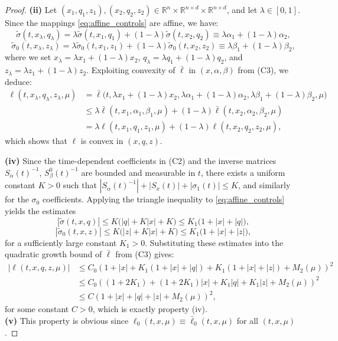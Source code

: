 \documentclass[11pt,a4paper]{article}
\begin{document}
\begin{proof}
\noindent
\textbf{(ii)} Let $(x_1, q_1, z_1),(x_2, q_2, z_2) \in \mathbb{R}^n \times \mathbb{R}^{n\times d} \times \mathbb{R}^{n\times d}$, and let $\lambda \in [0,1]$. Since the mappings \eqref{eq:affine_controls} are affine, we have:
\[
\tilde{\sigma}(t, x_\lambda, q_\lambda) = \lambda \tilde{\sigma}(t, x_1, q_1) + (1-\lambda)\tilde{\sigma}(t, x_2, q_2) \equiv \lambda \alpha_1 + (1-\lambda)\alpha_2,
\]
\[
\tilde{\sigma}_0(t, x_\lambda, z_\lambda) = \lambda \tilde{\sigma}_0(t, x_1, z_1) + (1-\lambda)\tilde{\sigma}_0(t, x_2, z_2) \equiv \lambda \beta_1 + (1-\lambda)\beta_2,
\]
where we set $x_\lambda = \lambda x_1 + (1-\lambda)x_2$, $q_\lambda = \lambda q_1 + (1-\lambda)q_2$, and $z_\lambda = \lambda z_1 + (1-\lambda)z_2$. Exploiting convexity of $\bar{\ell}$ in $(x,\alpha,\beta)$ from \textnormal{(C3)}, we deduce:
\begin{align*}
\ell(t, x_\lambda, q_\lambda, z_\lambda, \mu) &= \bar{\ell}\big(t, \lambda x_1 + (1-\lambda)x_2, \lambda \alpha_1 + (1-\lambda)\alpha_2, \lambda \beta_1 + (1-\lambda)\beta_2, \mu\big) \\
&\leq \lambda \bar{\ell}(t, x_1, \alpha_1, \beta_1, \mu) + (1-\lambda)\bar{\ell}(t, x_2, \alpha_2, \beta_2, \mu) \\
&= \lambda \ell(t, x_1, q_1, z_1, \mu) + (1-\lambda)\ell(t, x_2, q_2, z_2, \mu),
\end{align*}
which shows that $\ell$ is  convex in $(x,q,z)$.

\smallskip
\noindent
\textbf{(iv)}  Since the time-dependent coefficients in (C2) and the inverse matrices $S_\alpha (t)^{-1}$, $S_\beta^0(t)^{-1}$ are bounded and measurable in $t$, there exists a uniform constant $K > 0$ such that $|S_\alpha(t)^{-1}| + |S_x(t)| +|\sigma_1(t)| \leq K$, and similarly for the $\sigma_0$ coefficients. Applying the triangle inequality to \eqref{eq:affine_controls} yields the estimates
\[
|\tilde{\sigma}(t, x, q)| \leq K\big(|q| + K|x| + K\big) \leq K_1\big(1 + |x| + |q|\big),
\]
\[
|\tilde{\sigma}_0(t, x, z)| \leq K\big(|z| + K|x| + K\big) \leq K_1\big(1 + |x| + |z|\big),
\]
for a sufficiently large constant $K_1 > 0$. Substituting these estimates into the quadratic growth bound of $\bar{\ell}$ from \textnormal{(C3)} gives:
\begin{align*}

|\ell(t,x,q,z,\mu)| &\leq C_0 \left(1 + |x| + K_1(1 + |x| + |q|) + K_1(1 + |x| + |z|) + M_2(\mu)\right)^2 \\
&\leq C_0 \left((1+2K_1) + (1+2K_1)|x| + K_1|q| + K_1|z| + M_2(\mu)\right)^2 \\
& \leq C \left( 1 + |x| + |q| + |z| + M_2(\mu) \right)^2,
\end{align*}
for some constant $C>0$, which is exactly property (iv).\\
\textbf{(v)} This property is  obvious  since $\ell_0(t,x,\mu) \equiv \bar{\ell}_0(t,x,\mu)$ for all $(t,x,\mu)$.
\end{proof}
\end{document}
